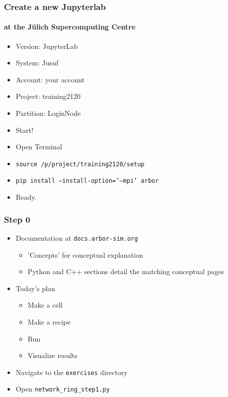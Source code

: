 \documentclass[t]{beamer}
\begin{document}
\begin{frame}
    \frametitle{Create a new Jupyterlab}
    \framesubtitle{at the Jülich Supercomputing Centre}
    \begin{itemize}
    \item Version: JupyterLab
    \item System: Jusuf
    \item Account: your account
    \item Project: training2120
    \item Partition: LoginNode
    \item[] Start!
    \item Open Terminal
    \item \texttt{source /p/project/training2120/setup}
    \item \texttt{pip install --install-option='--mpi' arbor}
    \item[] Ready.
    \end{itemize}
\end{frame}

\begin{frame}
    \frametitle{Step 0}
    \begin{itemize}
    \item Documentation at \texttt{docs.arbor-sim.org}
        \begin{itemize}
        \item 'Concepts' for conceptual explanation
        \item Python and C++ sections detail the matching conceptual pages
        \end{itemize}
    \item Today's plan
        \begin{itemize}
        \item Make a cell
        \item Make a recipe
        \item Run
        \item Visualize results
        \end{itemize}
    \item Navigate to the \texttt{exercises} directory
    \item Open \texttt{network\_ring\_step1.py}
    \end{itemize}
\end{frame}
\end{document}
